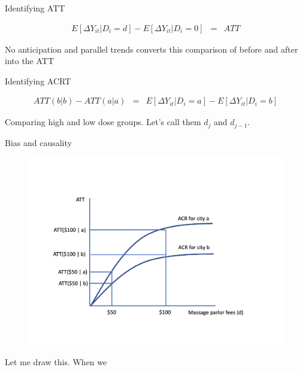 \documentclass{beamer}
\begin{document}
\begin{frame}{Identifying ATT}

\begin{eqnarray*}
E [ \Delta Y_{it} | D_i = d] - E[ \Delta Y_{it} | D_i = 0] &=& ATT
\end{eqnarray*}

\bigskip

No anticipation and parallel trends converts this comparison of before and after into the ATT

\end{frame}


\begin{frame}{Identifying ACRT}


\begin{eqnarray*}
ATT(b|b) - ATT(a|a) &=& E [ \Delta Y_{it} | D_i=a] - E[\Delta Y_{it} | D_i=b]
\end{eqnarray*}

Comparing high and low dose groups.  Let's call them $d_j$ and $d_{j-1}$. 

\end{frame}


\begin{frame}{Bias and causality}

\begin{figure}
\begin{center}
             \includegraphics[scale=0.3]{./lecture_includes/acrt_fig2.png}
\end{center}
\end{figure}

Let me draw this.  When we 

\end{frame}
\end{document}
